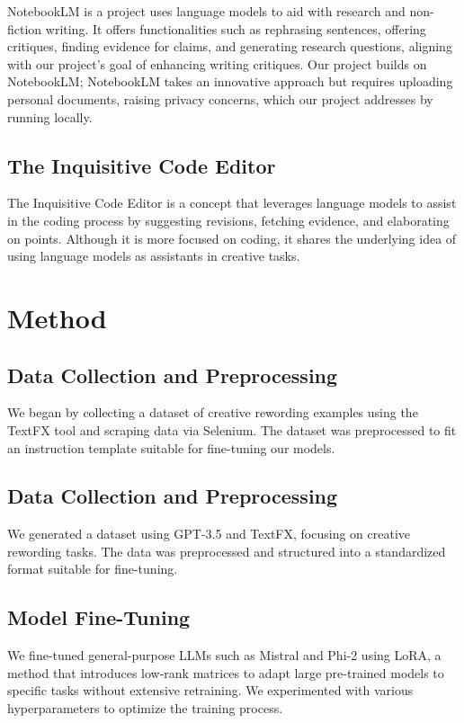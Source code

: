 \documentclass{article}
\begin{document}
NotebookLM is a project uses language models to aid with research and non-fiction
writing. It offers functionalities such as rephrasing sentences, offering critiques,
finding evidence for claims, and generating research questions, aligning with our
project's goal of enhancing writing critiques. Our project builds on NotebookLM;
NotebookLM takes an innovative approach but requires uploading personal documents,
raising privacy concerns, which our project addresses by running locally.

\subsection{The Inquisitive Code Editor}

The Inquisitive Code Editor is a concept that leverages language models to assist in
the coding process by suggesting revisions, fetching evidence, and elaborating on
points. Although it is more focused on coding, it shares the underlying idea of using
language models as assistants in creative tasks.

\section{Method}
\label{method}

\subsection{Data Collection and Preprocessing}

We began by collecting a dataset of creative rewording examples using the TextFX tool and scraping data via Selenium. The dataset was preprocessed to fit an instruction template suitable for fine-tuning our models.

\subsection{Data Collection and Preprocessing}

We generated a dataset using GPT-3.5 and TextFX, focusing on creative rewording tasks. The data was preprocessed and structured into a standardized format suitable for fine-tuning.

\subsection{Model Fine-Tuning}

We fine-tuned general-purpose LLMs such as Mistral and Phi-2 using LoRA, a method that introduces low-rank matrices to adapt large pre-trained models to specific tasks without extensive retraining. We experimented with various hyperparameters to optimize the training process.
\end{document}
